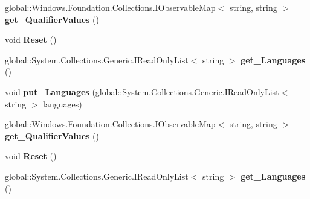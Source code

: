 \begin{DoxyCompactItemize}
global\+::\+Windows.\+Foundation.\+Collections.\+I\+Observable\+Map$<$ string, string $>$ {\bfseries get\+\_\+\+Qualifier\+Values} ()
\item 
\mbox{\label{interface_windows_1_1_application_model_1_1_resources_1_1_core_1_1_i_resource_context_ab035b013f5685da0aea1993176acf64c}} 
void {\bfseries Reset} ()
\item 
\mbox{\label{interface_windows_1_1_application_model_1_1_resources_1_1_core_1_1_i_resource_context_ad76a6478d3e3e15758a66c66adf8c42a}} 
global\+::\+System.\+Collections.\+Generic.\+I\+Read\+Only\+List$<$ string $>$ {\bfseries get\+\_\+\+Languages} ()
\item 
\mbox{\label{interface_windows_1_1_application_model_1_1_resources_1_1_core_1_1_i_resource_context_a6f1d9a3b30a2b326bcbad29ebaa379fb}} 
void {\bfseries put\+\_\+\+Languages} (global\+::\+System.\+Collections.\+Generic.\+I\+Read\+Only\+List$<$ string $>$ languages)
\item 
\mbox{\label{interface_windows_1_1_application_model_1_1_resources_1_1_core_1_1_i_resource_context_a90ec12fc8e5744d350fc3ea54c940698}} 
global\+::\+Windows.\+Foundation.\+Collections.\+I\+Observable\+Map$<$ string, string $>$ {\bfseries get\+\_\+\+Qualifier\+Values} ()
\item 
\mbox{\label{interface_windows_1_1_application_model_1_1_resources_1_1_core_1_1_i_resource_context_ab035b013f5685da0aea1993176acf64c}} 
void {\bfseries Reset} ()
\item 
\mbox{\label{interface_windows_1_1_application_model_1_1_resources_1_1_core_1_1_i_resource_context_ad76a6478d3e3e15758a66c66adf8c42a}} 
global\+::\+System.\+Collections.\+Generic.\+I\+Read\+Only\+List$<$ string $>$ {\bfseries get\+\_\+\+Languages} ()
\item 

\end{DoxyCompactItemize}
